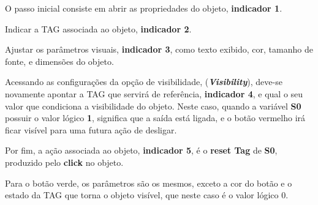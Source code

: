 \begin{figure}[ht!]
	\centering
\end{figure}


O passo inicial consiste em abrir as propriedades do objeto,
\textbf{indicador 1}. 

Indicar a TAG associada ao objeto,
\textbf{indicador 2}.

Ajustar os parâmetros visuais,
\textbf{indicador 3},
como texto exibido, cor, tamanho de fonte, e dimensões do objeto.

Acessando as configurações da opção de visibilidade,
(\textbf{\textit{Visibility}}), 
deve-se novamente apontar a TAG que servirá de referência,
\textbf{indicador 4},
e qual o seu valor que condiciona a visibilidade do objeto. 
Neste caso, 
quando a variável \textbf{S0} 
possuir o valor lógico \textbf{1}, 
significa que a saída está ligada, 
e o botão vermelho irá ficar visível para uma futura ação de desligar. 

Por fim, a ação associada ao objeto,
\textbf{indicador 5},
é o \textbf{reset Tag} de \textbf{S0}, 
produzido pelo \textbf{click} no objeto.


Para o botão verde, 
os parâmetros são os mesmos, 
exceto a cor do botão e o 
estado da TAG que torna o objeto visível, 
que neste caso é o valor lógico 0.






